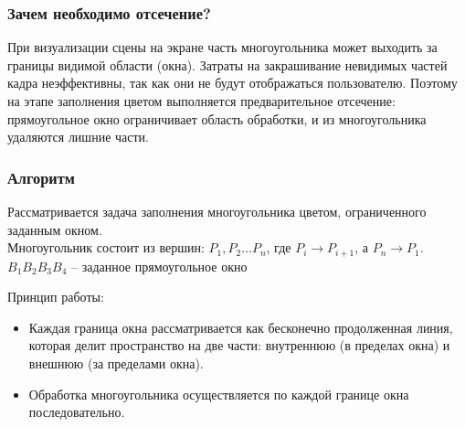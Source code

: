\subsubsection*{Зачем необходимо отсечение?}
При визуализации сцены на экране часть многоугольника может выходить за границы видимой области (окна). Затраты на закрашивание невидимых частей кадра неэффективны, так как они не будут отображаться пользователю. Поэтому на этапе заполнения цветом выполняется предварительное отсечение: прямоугольное окно ограничивает область обработки, и из многоугольника удаляются лишние части.

\subsubsection*{Алгоритм}
Рассматривается задача заполнения многоугольника цветом, ограниченного заданным окном.  \\
Многоугольник состоит из вершин:
$P_1, P_2 \dots P_n$, где \( P_i \rightarrow P_{i+1} \), а \( P_n \rightarrow P_1 \).\\
$B_1B_2B_3B_4$ -- заданное прямоугольное окно

Принцип работы:
\begin{itemize}
    \item Каждая граница окна рассматривается как бесконечно продолженная линия, которая делит пространство на две части: внутреннюю (в пределах окна) и внешнюю (за пределами окна).
    \item Обработка многоугольника осуществляется по каждой границе окна последовательно.
\end{itemize}

